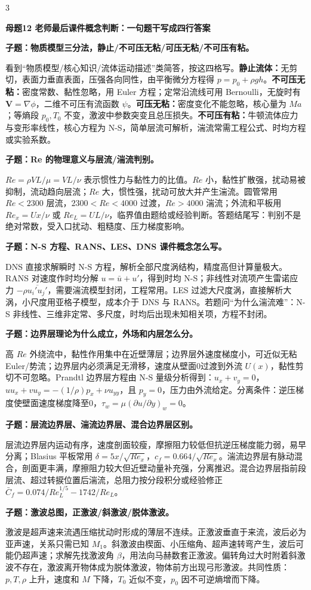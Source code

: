 \documentclass[a4paper]{article}
\newcommand{\mt}[1]{\vspace{0.45pt}\colorbox{M}{\parbox{\dimexpr\linewidth-2\fboxsep}{\color{white}\bfseries #1}}\par}
\newcommand{\qt}[1]{\vspace{0.25pt}\colorbox{Q}{\parbox{\dimexpr\linewidth-2\fboxsep}{\color{white}\bfseries #1}}\par}
\newcommand{\ans}[1]{\colorbox{G}{\parbox{\dimexpr\linewidth-2\fboxsep}{#1}}\par}
\begin{document}
\begin{multicols}{3}
\mt{母题12 老师最后课件概念判断：一句题干写成四行答案}
\qt{子题：物质模型三分法，静止/不可压无粘/可压无粘/不可压有粘。}
\ans{看到“物质模型/核心知识/流体运动描述”类简答，按这四格写。\textbf{静止流体：}无剪切，表面力垂直表面，压强各向同性，由平衡微分方程得 $p=p_0+\rho gh$。\textbf{不可压无粘：}密度常数、黏性忽略，用 Euler 方程；定常沿流线可用 Bernoulli，无旋时有 $\bm V=\nabla\phi$，二维不可压有流函数 $\psi$。\textbf{可压无粘：}密度变化不能忽略，核心量为 $Ma$；等熵段 $p_0,T_0$ 不变，激波中参数突变且总压损失。\textbf{不可压有粘：}牛顿流体应力与变形率线性，核心方程为 N-S，简单层流可解析，湍流常需工程公式、时均方程或实验系数。}
\qt{子题：Re 的物理意义与层流/湍流判别。}
\ans{$Re=\rho VL/\mu=VL/\nu$ 表示惯性力与黏性力的比值。$Re$ 小，黏性扩散强，扰动易被抑制，流动趋向层流；$Re$ 大，惯性强，扰动可放大并产生湍流。圆管常用 $Re<2300$ 层流，$2300<Re<4000$ 过渡，$Re>4000$ 湍流；外流和平板用 $Re_x=Ux/\nu$ 或 $Re_L=UL/\nu$，临界值由题给或经验判断。答题结尾写：判别不是绝对常数，受入口扰动、粗糙度、压力梯度影响。}
\qt{子题：N-S 方程、RANS、LES、DNS 课件概念怎么写。}
\ans{DNS 直接求解瞬时 N-S 方程，解析全部尺度涡结构，精度高但计算量极大。RANS 对速度作时均分解 $u=\bar u+u'$，得到时均 N-S；非线性对流项产生雷诺应力 $-\rho\overline{u_i'u_j'}$，需要湍流模型封闭，工程常用。LES 过滤大尺度涡，直接解析大涡，小尺度用亚格子模型，成本介于 DNS 与 RANS。若题问“为什么湍流难”：N-S 非线性、三维非定常、多尺度，时均后出现未知相关项，方程不封闭。}
\qt{子题：边界层理论为什么成立，外场和内层怎么分。}
\ans{高 $Re$ 外绕流中，黏性作用集中在近壁薄层；边界层外速度梯度小，可近似无粘 Euler/势流；边界层内必须满足无滑移，速度从壁面0过渡到外流 $U(x)$，黏性剪切不可忽略。Prandtl 边界层方程由 N-S 量级分析得到：$u_x+v_y=0$，$uu_x+vu_y=-(1/\rho)p_x+\nu u_{yy}$，且 $p_y=0$，压力由外流给定。分离条件：逆压梯度使壁面速度梯度降至0，$\tau_w=\mu(\partial u/\partial y)_w=0$。}
\qt{子题：层流边界层、湍流边界层、混合边界层区别。}
\ans{层流边界层内运动有序，速度剖面较瘦，摩擦阻力较低但抗逆压梯度能力弱，易早分离；Blasius 平板常用 $\delta=5x/\sqrt{Re_x}$，$c_f=0.664/\sqrt{Re_x}$。湍流边界层有脉动混合，剖面更丰满，摩擦阻力较大但近壁动量补充强，分离推迟。混合边界层指前段层流、超过转捩位置后湍流，总阻力按分段积分或经验修正 $\bar C_f=0.074/Re_L^{1/5}-1742/Re_L$。}
\qt{子题：激波总图，正激波/斜激波/脱体激波。}
\ans{激波是超声速来流遇压缩扰动时形成的薄层不连续。正激波垂直于来流，波后必为亚声速，关系只需已知 $M_1$。斜激波由楔面、小压缩角、超声速转弯产生，波后可能仍超声速；求解先找激波角 $\beta$，用法向马赫数套正激波。偏转角过大时附着斜激波不存在，激波离开物体成为脱体激波，物体前方出现弓形激波。共同性质：$p,T,\rho$ 上升，速度和 $M$ 下降，$T_0$ 近似不变，$p_0$ 因不可逆熵增而下降。}

\end{multicols}
\end{document}

